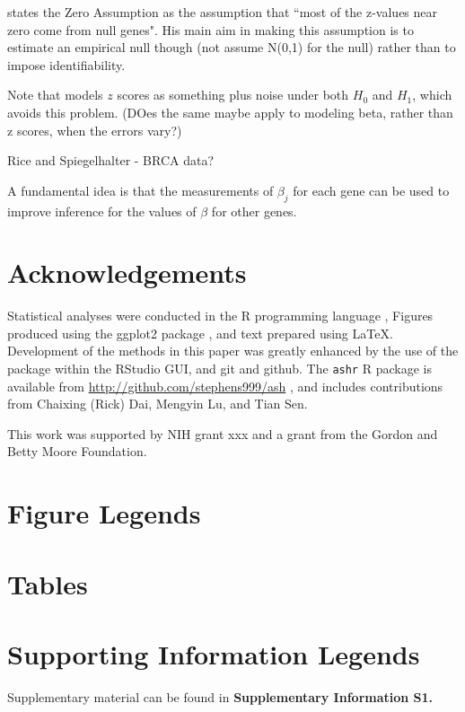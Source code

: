 \documentclass[11pt]{article}
\begin{document}
\cite{efron2008microarrays} states the Zero Assumption as the assumption that ``most of the z-values near zero come from null genes".
His main aim in making this assumption is to estimate an empirical null though (not assume N(0,1) for the null)
rather than to impose identifiability.

Note that \cite{muralidharan2010empirical} models $z$ scores as something plus noise under both $H_0$ and $H_1$, which
avoids this problem. (DOes the same maybe apply to modeling beta, rather than z scores, when the errors vary?)

Rice and Spiegelhalter - BRCA data?

A fundamental idea is
that the measurements of $\beta_j$ for each gene can be used to improve inference for the values of $\beta$ for other genes.


\section*{Acknowledgements}

Statistical analyses were conducted in the {\sf R} programming language \cite{Rcore:2012}, Figures produced using the ggplot2 package \cite{ggplot2}, and text
prepared using \LaTeX. Development of the methods in this paper was greatly enhanced by the use of the \cite{knitr} package within the RStudio GUI, and 
git and github. The {\tt ashr} R package is available from \url{http://github.com/stephens999/ash} , and includes contributions 
from Chaixing (Rick) Dai, Mengyin Lu, and Tian Sen. 

This work was supported by NIH grant xxx and a grant from the Gordon and Betty Moore Foundation.




\section*{Figure Legends}


\clearpage

\section*{Tables}

\section*{Supporting Information Legends}

Supplementary material can be found in {\bf Supplementary Information S1.}
\end{document}
